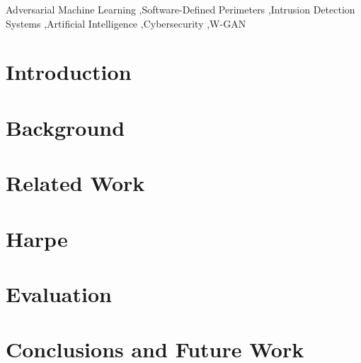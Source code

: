 \documentclass[a4paper,fleqn]{cas-dc}
\begin{document}
    \begin{keywords}
        Adversarial Machine Learning \sep Software-Defined Perimeters \sep Intrusion Detection Systems \sep Artificial Intelligence
        \sep Cybersecurity \sep W-GAN 
    \end{keywords}


    \maketitle



    \section{Introduction}\label{sec:introduction}
    



    \section{Background}\label{sec:background}
    



    \section{Related Work}\label{sec:related-work}
    



    \section{Harpe}\label{sec:proposal}
    



    \section{Evaluation}\label{sec:evaluation}
    



    \section{Conclusions and Future Work}\label{sec:conclusions-and-future-work}
    


    
    



\end{document}
